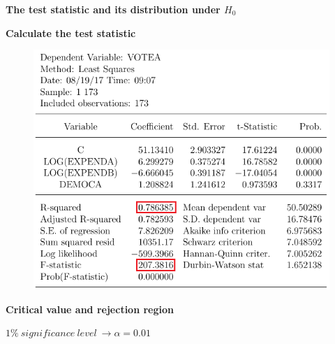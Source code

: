 \documentclass[12pt]{report}
\begin{document}
\noindent \textbf{The test statistic and its distribution under $H_0$}
\vspace{40mm}

\noindent \textbf{Calculate the test statistic}


\begin{figure}[H]
	\centering
	\includegraphics{q1_4}
\end{figure}
\vspace{-\baselineskip}
\noindent \textbf{Critical value and rejection region}

\noindent $1\%\ significance\ level\ \to \alpha = 0.01$
\end{document}
